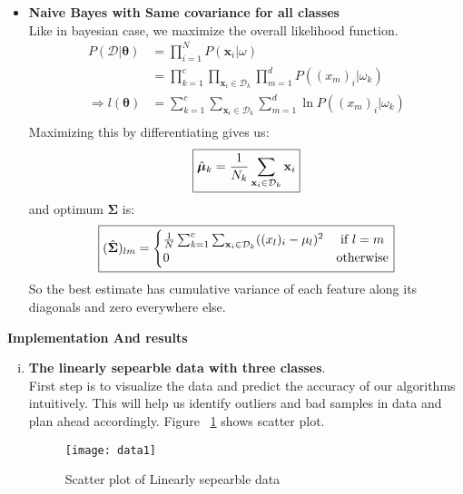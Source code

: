 \documentclass[11pt,paper=a4,answers]{exam}
\renewcommand{\vec}[1]{\mathbf{#1}}
\begin{document}
\begin{questions}
\begin{enumerate}[i.]
\begin{itemize}
                \item \textbf{Naive Bayes with Same covariance for all classes}\\
                Like in bayesian case, we maximize the overall likelihood function.\\
                \begin{align*}
                    P(\mathcal{D}| \bm{\theta}) &= \prod _{i=1}^N P(\vec{x}_i| \omega)\\
                    &= \prod _{k=1}^c \prod _{\vec{x}_i \in \mathcal{D}_k} \prod _{m=1}^d P((x_m)_i | \omega_k) \\ 
                    \Rightarrow l(\bm{\theta}) &= \sum_{k=1}^c \sum_{\vec{x}_i \in \mathcal{D}_k} \sum_{m=1}^d \ln P((x_m)_i | \omega_k) \\
                \end{align*}
                Maximizing this by differentiating gives us:
                $$\boxed{\hat{\bm{\mu}}_k = {1 \over N_k} \sum_{\vec{x}_i \in \mathcal{D}_k} \vec{x}_i }$$
                and optimum $\bm{\Sigma}$ is:
                $$\boxed{ (\hat{\bm{\Sigma}})_{lm} =
                \begin{cases}
                    {1 \over N}\sum_{k=1}^c\sum_{\vec{x}_i \in \mathcal{D}_k} ((x_l)_i - \mu_l)^2 &\text{ if } l = m\\
                    0 & \text{otherwise}
                \end{cases} }$$
                So the best estimate has cumulative variance of each feature along its diagonals and zero everywhere else.
            \end{itemize}
    \end{enumerate}
\newpage
\question \textbf{Implementation And results}
\begin{enumerate}[i.]
    \item \textbf{The linearly sepearble data with three classes}.\\
        First step is to visualize the data and predict the accuracy of our algorithms intuitively. This will help us identify outliers and bad samples in data and plan ahead accordingly. Figure ~\ref{fig:scatterData1} shows scatter plot.\\
        \begin{figure}[ht]
            \centering
            \texttt{[image: data1]}
            \vspace{-30pt}
            \caption{Scatter plot of Linearly sepearble data}
            \label{fig:scatterData1}

\end{figure}
\end{enumerate}
\end{questions}
\end{document}
